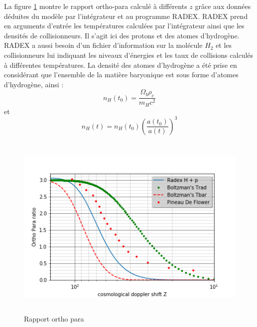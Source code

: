 \documentclass[10pt, a4paper]{report}
\numberwithin{equation}{subsection}
\begin{document}
La figure \ref{fig:ROP} montre le rapport ortho-para calculé à différents $z$ grâce aux données déduites du modèle par l'intégrateur et au programme RADEX. RADEX prend en arguments d'entrée les températures calculées par l'intégrateur ainsi que les densités de collisionneurs. Il s'agit ici des protons et des atomes d'hydrogène. RADEX a aussi besoin d'un fichier d'information sur la molécule $H_2$ et les collisionneurs lui indiquant les niveaux d'énergies et les taux de collisions calculés à différentes températures. La densité des atomes d'hydrogène a été prise en considérant que l'ensemble de la matière baryonique est sous forme d'atomes d'hydrogène, ainsi :
\begin{equation} \label{eq:NHT0}
 \boxed{n_H(t_0) = \frac{\Omega_{b} \rho_c}{m_H c^2} }  
\end{equation}
et
\begin{equation} \label{eq:NH}
\boxed{n_H(t) = n_H(t_0) \left(\frac{a(t_0)}{a(t)}\right)^3 } 
\end{equation}


\begin{figure}[]
\centering
\includegraphics[width=14.0cm,height=9cm]{rop.png}
\caption{Rapport ortho para}
\label{fig:ROP}
\end{figure}
\end{document}
